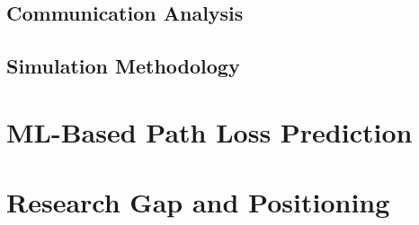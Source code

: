 \subsection{Communication Analysis}

\subsection{Simulation Methodology}

\section{ML-Based Path Loss Prediction}
\label{sec:ml-pathloss-related}


\section{Research Gap and Positioning}
\label{sec:research-gap}


